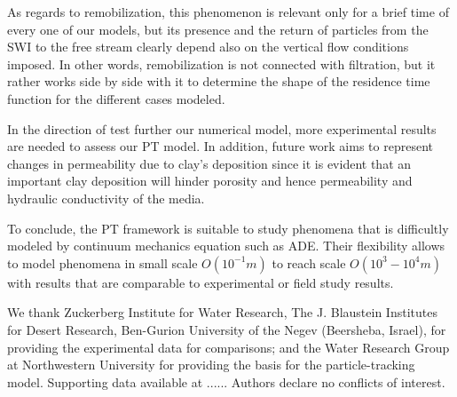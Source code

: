 \documentclass[draft,linenumbers]{agujournal2018}
\begin{document}
As regards to remobilization, this phenomenon is relevant only for a brief time of every one of our models, but its presence and the return of particles from the SWI to the free stream clearly depend also on the vertical flow conditions imposed. In other words, remobilization is not connected with filtration, but it rather works side by side with it to determine the shape of the residence time function for the different cases modeled. 

In the direction of test further our numerical model, more experimental results are needed to assess our PT model. In addition, future work aims to represent changes in permeability due to clay's deposition since it is evident that an important clay deposition will hinder porosity and hence permeability and hydraulic conductivity of the media. 

To conclude, the PT framework is suitable to study phenomena that is difficultly modeled by continuum mechanics equation such as ADE. Their flexibility allows to model phenomena in small scale $O(10^{-1}m)$ to reach scale $O(10^3-10^4 m)$ with results that are comparable to experimental or field study results.  

\acknowledgments
We thank Zuckerberg Institute for Water Research, The J. Blaustein Institutes for Desert Research, Ben-Gurion University of the Negev (Beersheba, Israel), for providing the experimental data for comparisons; and the Water Research Group at Northwestern University for providing the basis for the particle-tracking model. Supporting data available at ...... Authors declare no conflicts of interest.




\end{document}
